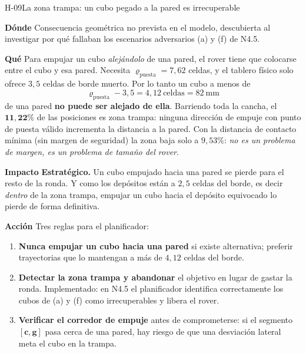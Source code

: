 \documentclass[11pt,a4paper]{article}
\newcommand{\campo}[1]{\par\smallskip\noindent\textbf{#1}\quad\ignorespaces}
\begin{document}
\begin{hallazgo}{H-09}{La zona trampa: un cubo pegado a la pared es irrecuperable}
\campo{Dónde} Consecuencia geométrica no prevista en el modelo, descubierta al
investigar por qué fallaban los escenarios adversarios (a) y (f) de N4.5.
\campo{Qué} Para empujar un cubo \emph{alejándolo} de una pared, el rover tiene que
colocarse entre el cubo y esa pared. Necesita $\varrho_{\mathrm{puesta}} = 7{,}62$
celdas, y el tablero físico solo ofrece $3{,}5$ celdas de borde muerto. Por lo tanto un
cubo a menos de
\[
  \varrho_{\mathrm{puesta}} - 3{,}5 = 4{,}12\ \text{celdas} = 82\ \mathrm{mm}
\]
de una pared \textbf{no puede ser alejado de ella}. Barriendo toda la cancha, el
$\mathbf{11{,}22\%}$ de las posiciones es zona trampa: ninguna dirección de empuje con
punto de puesta válido incrementa la distancia a la pared. Con la distancia de contacto
mínima (sin margen de seguridad) la zona baja solo a $9{,}53\%$: \emph{no es un problema
de margen, es un problema de tamaño del rover}.
\campo{Impacto} \textbf{Estratégico.} Un cubo empujado hacia una pared se pierde para el
resto de la ronda. Y como los depósitos están a $2{,}5$ celdas del borde, es decir
\emph{dentro} de la zona trampa, empujar un cubo hacia el depósito equivocado lo pierde
de forma definitiva.
\campo{Acción} Tres reglas para el planificador:
\begin{enumerate}[label=(\alph*),leftmargin=2em,itemsep=1pt,topsep=2pt]
\item \textbf{Nunca empujar un cubo hacia una pared} si existe alternativa; preferir
      trayectorias que lo mantengan a más de $4{,}12$ celdas del borde.
\item \textbf{Detectar la zona trampa y abandonar} el objetivo en lugar de gastar la
      ronda. Implementado: en N4.5 el planificador identifica correctamente los cubos de
      (a) y (f) como irrecuperables y libera el rover.
\item \textbf{Verificar el corredor de empuje} antes de comprometerse: si el segmento
      $[\mathbf c,\mathbf g]$ pasa cerca de una pared, hay riesgo de que una desviación
      lateral meta el cubo en la trampa.
\end{enumerate}
\end{hallazgo}
\end{document}
